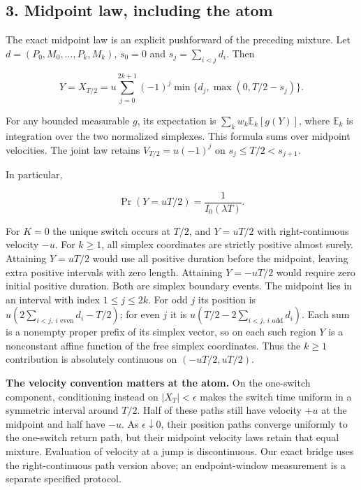 \documentclass[11pt,a4paper]{article}
\begin{document}
\hypertarget{midpoint-law-including-the-atom}{%
\subsection{3. Midpoint law, including the
atom}\label{midpoint-law-including-the-atom}}

The exact midpoint law is an explicit pushforward of the preceding
mixture. Let \(d=(P_0,M_0,\ldots,P_k,M_k)\), \(s_0=0\) and
\(s_j=\sum_{i<j}d_i\). Then

\[Y=X_{T/2}=u\sum_{j=0}^{2k+1}(-1)^j
        \min\{d_j,\max(0,T/2-s_j)\}.\]

For any bounded measurable \(g\), its expectation is
\(\sum_k w_k\mathbb E_k[g(Y)]\), where \(\mathbb E_k\) is integration
over the two normalized simplexes. This formula sums over midpoint
velocities. The joint law retains \(V_{T/2}=u(-1)^j\) on
\(s_j\le T/2<s_{j+1}\).

In particular,

\[\boxed{\Pr(Y=uT/2)=\frac1{I_0(\lambda T)}.}\]

For \(K=0\) the unique switch occurs at \(T/2\), and \(Y=uT/2\) with
right-continuous velocity \(-u\). For \(k\ge1\), all simplex coordinates
are strictly positive almost surely. Attaining \(Y=uT/2\) would use all
positive duration before the midpoint, leaving extra positive intervals
with zero length. Attaining \(Y=-uT/2\) would require zero initial
positive duration. Both are simplex boundary events. The midpoint lies
in an interval with index \(1\le j\le2k\). For odd \(j\) its position is
\(u(2\sum_{i<j,\ i\text{ even}}d_i-T/2)\); for even \(j\) it is
\(u(T/2-2\sum_{i<j,\ i\text{ odd}}d_i)\). Each sum is a nonempty proper
prefix of its simplex vector, so on each such region \(Y\) is a
nonconstant affine function of the free simplex coordinates. Thus the
\(k\ge1\) contribution is absolutely continuous on \((-uT/2,uT/2)\).

\textbf{The velocity convention matters at the atom.} On the one-switch
component, conditioning instead on \(|X_T|<\epsilon\) makes the switch
time uniform in a symmetric interval around \(T/2\). Half of these paths
still have velocity \(+u\) at the midpoint and half have \(-u\). As
\(\epsilon\downarrow0\), their position paths converge uniformly to the
one-switch return path, but their midpoint velocity laws retain that
equal mixture. Evaluation of velocity at a jump is discontinuous. Our
exact bridge uses the right-continuous path version above; an
endpoint-window measurement is a separate specified protocol.
\end{document}

